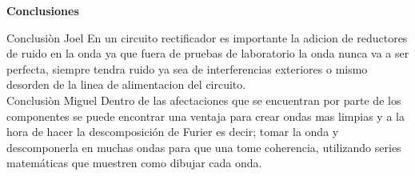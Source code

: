 ﻿\documentclass[letterpaper]{article}
\begin{document}
    
    
    
    
    
    
    
    
    
    
    
    
    \begin{LARGE}
            \textbf{Conclusiones}\\
    \end{LARGE}
    
        \begin{large}    
		Conclusiòn Joel
       En un circuito rectificador es importante la adicion de reductores de ruido en la onda ya que fuera de pruebas de laboratorio la  onda nunca va a ser perfecta, siempre tendra ruido ya sea de interferencias exteriores o mismo desorden de la linea de alimentacion del circuito.\\
   		Conclusiòn Miguel
        Dentro de las afectaciones que se encuentran por parte de los componentes se puede encontrar una ventaja para crear ondas mas limpias y a la hora de hacer la descomposición de Furier es decir; tomar la onda y descomponerla en muchas ondas para que una tome coherencia, utilizando series matemáticas que muestren como dibujar cada onda.
        
        \end{large}
\end{document}
